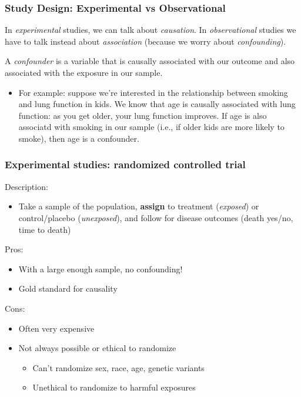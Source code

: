 \documentclass[12pt, 
hyperref={colorlinks=true, linkcolor=blue, urlcolor=cyan}]{beamer}
\begin{document}
\begin{frame}
\frametitle{Study Design: Experimental vs Observational}

In \textit{experimental} studies, we can talk about \color{blue} \textit{causation}\color{black}. In \textit{observational} studies we have to talk instead about \color{blue} \textit{association} \color{black}(because we worry about \color{blue} \textit{confounding}\color{black}). %

A \color{blue} \textit{confounder} \color{black} is a variable that is causally associated with our outcome and also associated with the exposure in our sample. \vspace{-0.2cm}
\begin{itemize}
\item[] For example: suppose we're interested in the relationship between smoking and lung function in kids. We know that age is causally associated with lung function: as you get older, your lung function improves. If age is also associatd with smoking in our sample (i.e., if older kids are more likely to smoke), then age is a confounder.
\end{itemize} %

\end{frame}

\begin{frame} %
\frametitle{Experimental studies: randomized controlled trial}
Description:\vspace{-0.3cm}
\begin{itemize}
\item Take a sample of the population, \textbf{assign} to treatment (\textit{exposed}) or control/placebo (\textit{unexposed}), and follow for disease outcomes (death yes/no, time to death)
\end{itemize}

Pros:\vspace{-0.3cm}
\begin{itemize}
\item With a large enough sample, no confounding!
\item Gold standard for causality
\end{itemize}

Cons:\vspace{-0.3cm}
\begin{itemize}
\item Often very expensive
\item Not always possible or ethical to randomize
	\begin{itemize}
	\item Can't randomize sex, race, age, genetic variants
	\item Unethical to randomize to harmful exposures
	\end{itemize}
\end{itemize}
\end{frame}
\end{document}
